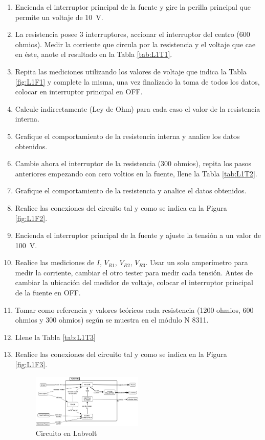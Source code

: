 \documentclass[12pt,letterpaper]{report}
\begin{document}
\begin{enumerate}
\item Encienda el interruptor principal de la fuente y gire la perilla principal que permite un voltaje de \SI{10}{\volt}. 
\item La resistencia posee 3 interruptores, accionar el interruptor del centro (600 ohmios). Medir la corriente que circula por la  resistencia y el voltaje que cae en éste, anote el resultado en la Tabla \ref{tab:L1T1}.
\item	Repita las mediciones utilizando los valores de voltaje que indica la Tabla \ref{fig:L1F1} y complete la misma, una vez finalizado la toma de todos los datos, colocar en interruptor principal en OFF. 
\item Calcule indirectamente (Ley de Ohm) para cada caso el valor de la resistencia interna.
\item	Grafique el comportamiento de la resistencia interna y analice los datos obtenidos. 
\item	Cambie ahora el interruptor de la resistencia (300 ohmios), repita los pasos anteriores empezando con cero voltios en la fuente, llene la Tabla \ref{tab:L1T2}.
\item  Grafique el comportamiento de la resistencia y analice el datos obtenidos. 
\item Realice las conexiones del circuito tal y como se indica en la Figura \ref{fig:L1F2}.
\item Encienda el interruptor principal de la fuente y ajuste la tensión a un valor de \SI{100}{\volt}.
\item Realice las mediciones de $I$, $V_{R1}$, $V_{R2}$, $V_{R3}$. Usar un solo amperímetro para medir la corriente, cambiar el otro tester para medir cada tensión. Antes de cambiar la ubicación del medidor de voltaje, colocar el interruptor principal de la fuente en OFF.
\item Tomar como referencia y valores teóricos cada resistencia (1200 ohmios, 600 ohmios y 300 ohmios) según se muestra en el módulo N 8311.
\item Llene la Tabla \ref{tab:L1T3}
\item Realice las conexiones del circuito tal y como se indica en la Figura \ref{fig:L1F3}.

\begin{figure}[H]
\centering
\includegraphics[width=0.5\textwidth]{fig/tostadora.jpg}
\caption{Circuito en Labvolt}
\end{figure}


\end{enumerate}
\end{document}

